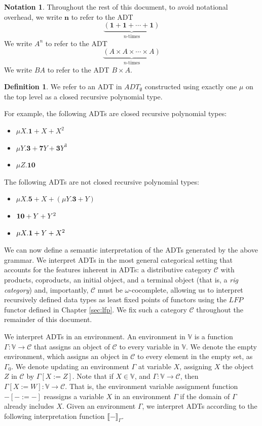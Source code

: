 \documentclass{msthesis}
\theoremstyle{definition}
\newtheorem{definition}[theorem]{Definition}
\newtheorem*{notation}{Notation}
\newcommand{\semof}[1]{\llbracket{#1}\rrbracket}
\newcommand{\mcC}{\mathcal{C}}
\newcommand{\vars}{\mathbb{V}}
\begin{document}
\begin{notation}
Throughout the rest of this document, to avoid notational overhead, we write $\mathbf{n}$ to refer to the ADT
\[\underbrace{(\mathbf{1} + \mathbf{1} + \cdots + \mathbf{1})}_{n\text{-times}}\]
We write $A^n$ to refer to the ADT
\[ \underbrace{(A \times A \times \cdots \times A)}_{n\text{-times}} \]
We write $BA$ to refer to the ADT $B \times A$.
\end{notation}

\begin{definition}
    We refer to an ADT in $ADT_{\emptyset}$ constructed using exactly one $\mu$ on the top level as a closed recursive polynomial type.  
\end{definition}
For example, the following ADTs are closed recursive polynomial types:
\begin{itemize}[nosep]
    \item $\mu X.\mathbf{1} + X + X^2$
    \item $\mu Y.\mathbf{3} + \mathbf{7}Y + \mathbf{3}Y^3$
    \item $\mu Z.\mathbf{10}$
\end{itemize}
The following ADTs are not closed recursive polynomial types:
\begin{itemize}[nosep]
    \item $\mu X. \mathbf{5} + X + (\mu Y.\mathbf{3} + Y)$
    \item $\mathbf{10} + Y + Y^2$
    \item $\mu X.\mathbf{1} + Y + X^2$
\end{itemize}

We can now define a semantic interpretation of the ADTs generated by the above grammar.  We interpret ADTs in the most general categorical setting that accounts for the features inherent in ADTs: a distributive category $\mcC$ with products, coproducts, an initial object, and a terminal object (that is, a \emph{rig category}) and, importantly, $\mcC$ must be $\omega$-cocomplete, allowing us to interpret recursively defined data types as least fixed points of functors using the $LFP$ functor defined in Chapter \ref{sec:lfp}.  We fix such a category $\mcC$ throughout the remainder of this document.

We interpret ADTs in an environment.  An environment in $\vars$ is a function $\Gamma : \vars \to \mcC$ that assigns an object of $\mcC$ to every variable in $\vars$.  We denote the empty environment, which assigns an object in $\mcC$ to every element in the empty set, as $\Gamma_0$.  We denote updating an environment $\Gamma$ at variable $X$, assigning $X$ the object $Z$ in $\mcC$ by $\Gamma[X := Z]$. Note that if $X \in \vars$, and $\Gamma : \vars \to \mcC$, then $\Gamma[X:=W] : \vars \to \mcC$.  That is, the environment variable assignment function $-[-:=-]$ reassigns a variable $X$ in an environment $\Gamma$ if the domain of $\Gamma$ already includes $X$. Given an environment $\Gamma$, we interpret ADTs according to the following interpretation function $\semof{-}_\Gamma$.
\end{document}
